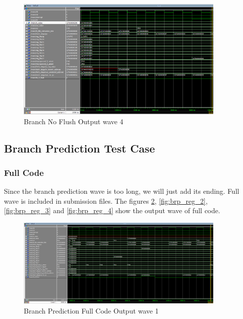 \begin{figure}[H]
    \centering
    \includegraphics[width=0.9\textwidth]{images/test_cases/branch/Branch_no_flush_4.PNG}
    \caption{Branch No Flush Output wave 4}
    \label{fig:br_nop_4}
\end{figure}

\subsection{Branch Prediction Test Case}

\subsubsection{Full Code}
Since the branch prediction wave is too long, we will just add its ending. Full wave is included in submission files. The figures \ref{fig:brp_reg_1}, \ref{fig:brp_reg_2}, \ref{fig:brp_reg_3} and \ref{fig:brp_reg_4} show the output wave of full code.

\begin{figure}[H]
    \centering
    \includegraphics[width=0.9\textwidth]{images/test_cases/branch_prediction/BranchPrediction_regular_20.PNG}
    \caption{Branch Prediction Full Code Output wave 1}
    \label{fig:brp_reg_1}
\end{figure}

